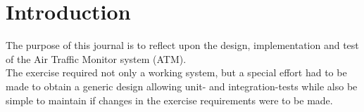 \section{Introduction}
The purpose of this journal is to reflect upon the design, implementation and test of the Air Traffic Monitor system (ATM).\\
The exercise required not only a working system, but a special effort had to be made to obtain a generic design allowing unit- and integration-tests while also be simple to maintain if changes in the exercise requirements were to be made. \\

